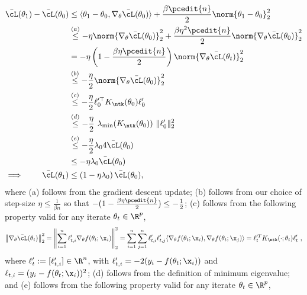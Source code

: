 \begin{equation}
\begin{aligned}
\bar{\cL}(\theta_{1})-\bar{\cL}(\theta_{0})&\leq \langle \theta_{1}-\theta_0,\nabla_{\theta}\bar{\cL}(\theta_0)\rangle  +\frac{\beta\pcedit{n}}{2}\norm{\theta_{1}-\theta_0}^2_2\\
& \overset{(a)}{\leq} -\eta\norm{\nabla_\theta \bar{\cL}(\theta_0)}_2^2 +\frac{\beta\eta^2\pcedit{n}}{2}\norm{\nabla_\theta \bar{\cL}(\theta_0)}^2_2\\
&= - \eta \left(1 - \frac{\beta\eta\pcedit{n}}{2} \right)\norm{\nabla_\theta \bar{\cL}(\theta_t)}^2_2\\
%
&\overset{(b)}{\leq} - \frac{\eta}{2}\norm{\nabla_\theta \bar{\cL}(\theta_0)}^2_2 \\
&\overset{(c)}{\leq} - \frac{\eta}{2} \ell_0'^\top K_{\ntk}(\theta_0)\ell_0' \\
&\overset{(d)}{\leq} - \frac{\eta}{2} ~\lambda_{\min}(K_{\ntk}(\theta_0))~ \|\ell'_0 \|_2^2 \\
&\overset{(e)}{\leq} - \frac{\eta}{2}  \lambda_0 4 \bar{\cL}(\theta_0) \\
&\leq - \eta\lambda_0 \bar{\cL}(\theta_0)\\
\implies \qquad \bar{\cL}(\theta_{1})&\leq \left(1- \eta  \lambda_0 \right) \bar{\cL}(\theta_0),
\end{aligned}
\end{equation}
where (a) follows from the gradient descent update;  
%
(b) follows from our choice of step-size $\eta  \leq \frac{1}{\beta n}$ so that $-(1-\frac{\beta \eta \pcedit{n}}{2}) \leq -\frac{1}{2}$; 
%
(c) follows from the following property valid for any iterate $\theta_t\in\R^p$, 
\begin{align*}
\left\| \nabla_\theta \bar{\cL}(\theta_t) \right\|_2^2 = \left\| \sum_{i=1}^n \ell'_{t,i} \nabla_\theta f(\theta_t;\x_i) \right\|_2^2 =  \sum_{i=1}^n \sum_{j=1}^n \ell'_{t,i} \ell'_{t,j} \langle \nabla_{\theta} f(\theta_t;\x_i), \nabla_{\theta} f(\theta_t;\x_j) \rangle = \ell_t'^T K_{\ntk}(\cdot;\theta_t) \ell_t'~,
\end{align*}
where $\ell_t' := [\ell'_{t,i}] \in \R^n$, with $\ell'_{t,i} = -2(y_i-f(\theta_t;\x_i))$ and  $\ell_{t,i} = (y_i - f(\theta_t;\x_i))^2$; 
%
(d)  follows from the definition of minimum eigenvalue;
%
and (e) follows from the following property valid for any iterate $\theta_t\in\R^p$,
